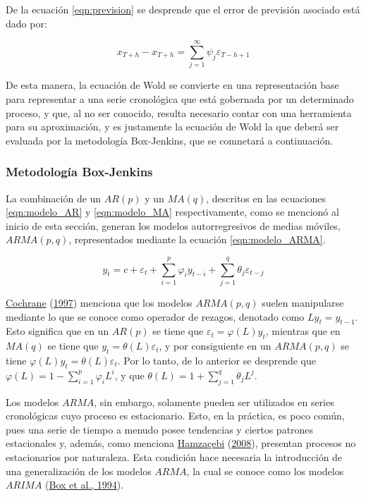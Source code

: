 \documentclass[
]{article}
\begin{document}
De la ecuación \eqref{eqn:prevision} se desprende que el error de
previsión asociado está dado por:

\begin{equation}
\label{eqn:error_prevision}
x_{T+h}- \hat x_{T+h}=\sum_{j=1}^{\infty} \psi_j \varepsilon_{T-h+1}
\end{equation}

De esta manera, la ecuación de Wold se convierte en una representación
base para representar a una serie cronológica que está gobernada por un
determinado proceso, y que, al no ser conocido, resulta necesario contar
con una herramienta para su aproximación, y es justamente la ecuación de
Wold la que deberá ser evaluada por la metodología Box-Jenkins, que se
comnetará a continuación.

\subsubsection{Metodología Box-Jenkins}

La combinación de un \(AR(p)\) y un \(MA(q)\), descritos en las
ecuaciones \eqref{eqn:modelo_AR} y \eqref{eqn:modelo_MA}
respectivamente, como se mencionó al inicio de esta sección, generan los
modelos autorregresivos de medias móviles, \(ARMA(p,q)\), representados
mediante la ecuación \eqref{eqn:modelo_ARMA}.

\begin{equation}
\label{eqn:modelo_ARMA}
y_t=c+\varepsilon_t+\sum_{i=1}^p \varphi_iy_{t-i}+\sum_{j=1}^q \theta_j \varepsilon_{t-j}
\end{equation}

\protect\hyperlink{ref-Cochrane}{Cochrane}
(\protect\hyperlink{ref-Cochrane}{1997}) menciona que los modelos
\(ARMA(p,q)\) suelen manipularse mediante lo que se conoce como operador
de rezagos, denotado como \(Ly_t=y_{t-1}\). Esto significa que en un
\(AR(p)\) se tiene que \(\varepsilon_t=\varphi(L)y_t\), mientras que en
\(MA(q)\) se tiene que \(y_t=\theta(L)\varepsilon_t\), y por
consiguiente en un \(ARMA(p,q)\) se tiene
\(\varphi(L)y_t=\theta(L)\varepsilon_t\). Por lo tanto, de lo anterior
se desprende que \(\varphi(L)=1-\sum_{i=1}^p \varphi_iL^i\), y que
\(\theta(L)=1+\sum_{j=1}^q\theta_jL^j\).

Los modelos \(ARMA\), sin embargo, solamente pueden ser utilizados en
series cronológicas cuyo proceso es estacionario. Esto, en la práctica,
es poco común, pues una serie de tiempo a menudo posee tendencias y
ciertos patrones estacionales y, además, como menciona
\protect\hyperlink{ref-Hamzacebi}{Hamzaçebi}
(\protect\hyperlink{ref-Hamzacebi}{2008}), presentan procesos no
estacionarios por naturaleza. Esta condición hace necesaria la
introducción de una generalización de los modelos \(ARMA\), la cual se
conoce como los modelos \(ARIMA\)
(\protect\hyperlink{ref-box-jenkins}{Box et al., 1994}).
\end{document}
